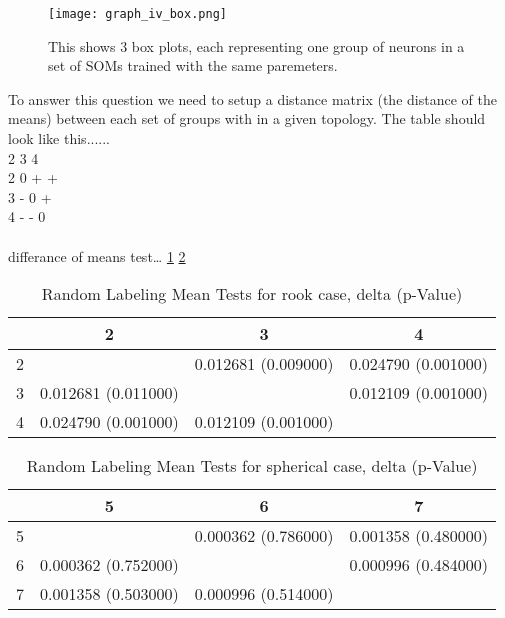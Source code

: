 \begin{figure}
\centering
\texttt{[image: graph\_iv\_box.png]}
\caption{This shows 3 box plots, each representing one group of neurons in a set
of SOMs trained with the same paremeters.}
\label{fGraphIV}
\end{figure}





To answer this question we need to setup a distance matrix (the distance of the
means) between each set of groups with in a given topology.  The table should
look like this...... 
\\
  2 3 4\\
2 0 + +\\
3 - 0 +\\
4 - - 0\\
\\
differance of means test\ldots
\ref{randomLabelTableRook}
\ref{randomLabelTableGraph}

\begin{table}
\centering
\caption{Random Labeling Mean Tests for rook case,  delta (p-Value)}
\label{randomLabelTableRook}
\begin{tabular}{|c||c|c|c|}
\hline
&2&3&4\\
\hline
\hline
2& & 0.012681 (0.009000)& 0.024790 (0.001000)\\
\hline
3& 0.012681 (0.011000)& & 0.012109 (0.001000)\\
\hline
4& 0.024790 (0.001000)& 0.012109 (0.001000)& \\
\hline
\end{tabular} \end{table}


\begin{table}
\centering
\caption{Random Labeling Mean Tests for spherical case,  delta (p-Value)}
\label{randomLabelTableGraph}
\begin{tabular}{|c||c|c|c|}
\hline
&5&6&7\\
\hline
\hline
5& & 0.000362 (0.786000)& 0.001358 (0.480000)\\
\hline
6& 0.000362 (0.752000)& & 0.000996 (0.484000)\\
\hline
7& 0.001358 (0.503000)& 0.000996 (0.514000)& \\
\hline
\end{tabular} \end{table}


